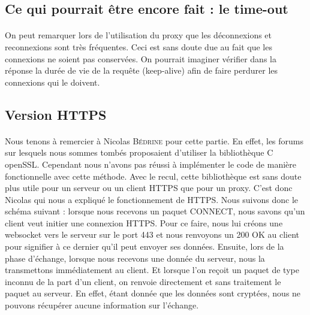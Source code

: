 \subsection{Ce qui pourrait être encore fait : le time-out}
\paragraph{}
On peut remarquer lors de l'utilisation du proxy que les déconnexions et reconnexions sont très fréquentes. Ceci est sans doute due au fait que les connexions ne soient pas conservées. On pourrait imaginer vérifier dans la réponse la durée de vie de la requête (keep-alive) afin de faire perdurer les connexions qui le doivent. 

\subsection{Version HTTPS}
\paragraph{}
Nous tenons à remercier à Nicolas \textsc{Bédrine} pour cette partie. En effet, les forums sur lesquels nous sommes tombés proposaient d'utiliser la bibliothèque C openSSL. Cependant nous n'avons pas réussi à implémenter le code de manière fonctionnelle avec cette méthode. Avec le recul, cette bibliothèque est sans doute plus utile pour un serveur ou un client HTTPS que pour un proxy. C'est donc Nicolas qui nous a expliqué le fonctionnement de HTTPS. \linebreak
Nous suivons donc le schéma suivant : lorsque nous recevons un paquet CONNECT, nous savons qu'un client veut initier une connexion HTTPS. Pour ce faire, nous lui créons une websocket vers le serveur sur le port 443 et nous renvoyons un 200 OK au client pour signifier à ce dernier qu'il peut envoyer ses données. \linebreak
Ensuite, lors de la phase d'échange, lorsque nous recevons une donnée du serveur, nous la transmettons immédiatement au client. Et lorsque l'on reçoit un paquet de type inconnu de la part d'un client, on renvoie directement et sans traitement le paquet au serveur. En effet, étant donnée que les données sont cryptées, nous ne pouvons récupérer aucune information sur l'échange.